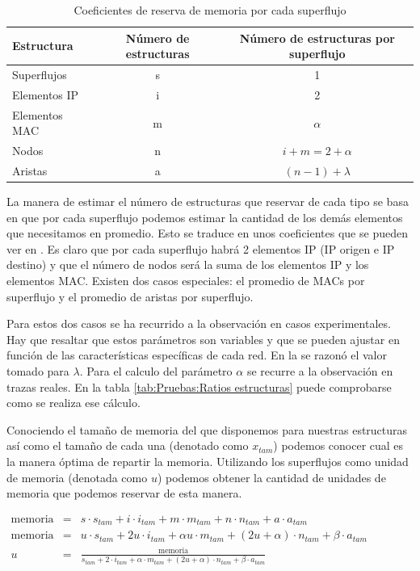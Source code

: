 \documentclass[twoside, 12pt]{epstfg}
\begin{document}
\begin{table}[hbtp]
	\centering
	\small
	\begin{tabular}{lcc}
		\toprule \textbf{Estructura} & \textbf{Número de estructuras}  & \textbf{Número de estructuras por superflujo} \\ \midrule
		Superflujos & s & 1 \\
		Elementos IP & i & 2 \\
		Elementos MAC & m & $\alpha$ \\
		Nodos & n & $i + m = 2 + \alpha$ \\
		Aristas & a & $(n - 1) + \lambda$  \\ \bottomrule
	\end{tabular}
	\caption{Coeficientes de reserva de memoria por cada superflujo}
	\label{tab:Desarrollo:Coeficientes memoria}
\end{table}

La manera de estimar el número de estructuras que reservar de cada tipo se basa en que por cada superflujo podemos estimar la cantidad de los demás elementos que necesitamos en promedio. Esto se traduce en unos coeficientes que se pueden ver en . Es claro que por cada superflujo habrá 2 elementos IP (IP origen e IP destino) y que el número de nodos será la suma de los elementos IP y los elementos MAC. Existen dos casos especiales: el promedio de MACs por superflujo y el promedio de aristas por superflujo.

Para estos dos casos se ha recurrido a la observación en casos experimentales. Hay que resaltar que estos parámetros son variables y que se pueden ajustar en función de las características específicas de cada red. En la  se razonó el valor tomado para $\lambda$. Para el calculo del parámetro $\alpha$ se recurre a la observación en trazas reales. En la tabla \ref{tab:Pruebas:Ratios estructuras} puede comprobarse como se realiza ese cálculo.

Conociendo el tamaño de memoria del que disponemos para nuestras estructuras así como el tamaño de cada una (denotado como $x_{tam}$) podemos conocer cual es la manera óptima de repartir la memoria. Utilizando los superflujos como unidad de memoria (denotada como $u$) podemos obtener la cantidad de unidades de memoria que podemos reservar de esta manera.

$\begin{array}{lcl}
	\mathrm{memoria} & = & s \cdot s_{tam} + i \cdot i_{tam} + m \cdot m_{tam} + n \cdot n_{tam} + a \cdot a_{tam}\\
	\mathrm{memoria} & = & u \cdot s_{tam} + 2u \cdot i_{tam} + \alpha u \cdot m_{tam} + (2u+\alpha) \cdot n_{tam} + \beta \cdot a_{tam} \\
	u & = & \frac{\mathrm{memoria}}{s_{tam} + 2 \cdot i_{tam} + \alpha \cdot m_{tam} + (2u+\alpha) \cdot n_{tam} + \beta \cdot a_{tam}}
\end{array}$
\end{document}
